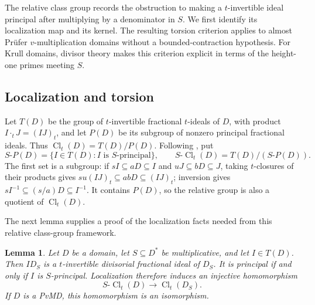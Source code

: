 \documentclass[11pt]{amsart}
\newtheorem{lemma}[theorem]{Lemma}
\theoremstyle{definition}
\theoremstyle{remark}
\DeclareMathOperator{\Cl}{Cl}
\begin{document}
The relative class group records the obstruction to making a
$t$-invertible ideal principal after multiplying by a denominator in
$S$. We first identify its localization map and its kernel. The
resulting torsion criterion applies to almost Pr\"ufer
$v$-multiplication domains without a bounded-contraction hypothesis.
For Krull domains, divisor theory makes this criterion explicit in
terms of the height-one primes meeting $S$.

\subsection{Localization and torsion}

Let $T(D)$ be the group of $t$-invertible fractional $t$-ideals of
$D$, with product $I\cdot_t J=(IJ)_t$, and let $P(D)$ be its subgroup
of nonzero principal fractional ideals. Thus
$\Cl_t(D)=T(D)/P(D)$. Following \cite{HamedNagata, Hamed}, put
\[
 S\text{-}P(D)=\{I\in T(D):I\text{ is }S\text{-principal}\},
 \qquad
 S\text{-}\Cl_t(D)=T(D)/(S\text{-}P(D)).
\]
The first set is a subgroup: if $sI\subseteq aD\subseteq I$ and
$uJ\subseteq bD\subseteq J$, taking $t$-closures of their products
gives $su(IJ)_t\subseteq abD\subseteq(IJ)_t$; inversion gives
$sI^{-1}\subseteq(s/a)D\subseteq I^{-1}$. It contains $P(D)$,
so the relative group is also a quotient of $\Cl_t(D)$.

The next lemma supplies a proof of the localization facts needed
from this relative class-group framework.

\begin{lemma}\label{l:class-localization-kernel}
Let $D$ be a domain, let $S\subseteq D^\ast$ be multiplicative,
and let $I\in T(D)$. Then $ID_S$ is a $t$-invertible divisorial
fractional ideal of $D_S$. It is principal if and only if $I$ is
$S$-principal. Localization therefore induces an injective homomorphism
\[
 S\text{-}\Cl_t(D)\longrightarrow\Cl_t(D_S).
\]
If $D$ is a PvMD, this homomorphism is an isomorphism.
\end{lemma}
\end{document}
